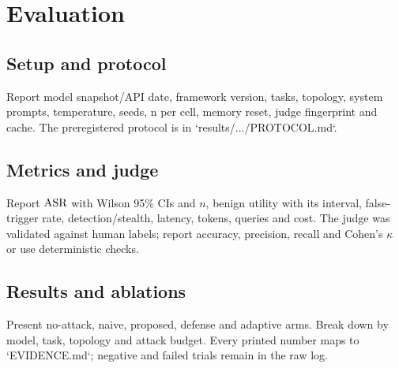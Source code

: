 \section{Evaluation}
\subsection{Setup and protocol}
Report model snapshot/API date, framework version, tasks, topology, system prompts, temperature, seeds, n per
cell, memory reset, judge fingerprint and cache. The preregistered protocol is in `results/.../PROTOCOL.md`.
\subsection{Metrics and judge}
Report $\mathrm{ASR}$ with Wilson 95\% CIs and $n$, benign utility with its interval, false-trigger rate, detection/stealth,
latency, tokens, queries and cost. The judge was validated against human labels; report accuracy, precision,
recall and Cohen's $\kappa$ or use deterministic checks.
\subsection{Results and ablations}
Present no-attack, naive, proposed, defense and adaptive arms. Break down by model, task, topology and attack
budget. Every printed number maps to `EVIDENCE.md`; negative and failed trials remain in the raw log.
